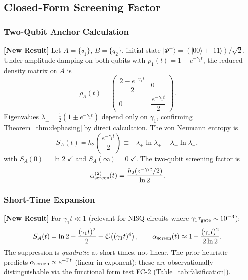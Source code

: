 \documentclass[12pt,letterpaper]{article}
\theoremstyle{definition}
\theoremstyle{remark}
\newcommand{\newresult}{\textbf{[New Result]}}
\newcommand{\ascreen}{\alpha_{\rm screen}}
\newcommand{\gammaone}{\gamma_{1}}
\newcommand{\half}{\tfrac{1}{2}}
\begin{document}
\subsection{Closed-Form Screening Factor}

\subsubsection{Two-Qubit Anchor Calculation}

\newresult{} Let $A = \{q_1\}$, $B = \{q_2\}$, initial state
$|\Phi^+\rangle = (|00\rangle + |11\rangle)/\sqrt{2}$.
Under amplitude damping on both qubits with $p_1(t) = 1-e^{-\gammaone t}$, the
reduced density matrix on $A$ is
\begin{equation}
\rho_A(t) = \begin{pmatrix}
  \dfrac{2 - e^{-\gammaone t}}{2} & 0 \\[6pt]
  0 & \dfrac{e^{-\gammaone t}}{2}
\end{pmatrix}.
\end{equation}
Eigenvalues $\lambda_\pm = \half(1\pm e^{-\gammaone t})$ depend only on $\gammaone$,
confirming Theorem~\ref{thm:dephasing} by direct calculation.  The von Neumann entropy is
\begin{equation}
S_A(t) = h_2\!\left(\frac{e^{-\gammaone t}}{2}\right)
         \equiv -\lambda_+\ln\lambda_+ - \lambda_-\ln\lambda_-,
\label{eq:SA2qubit}
\end{equation}
with $S_A(0) = \ln 2\;\checkmark$ and $S_A(\infty) = 0\;\checkmark$.
The two-qubit screening factor is
\begin{equation}
\alpha_{\rm screen}^{(2)}(t)
  = \frac{h_2\!\left(e^{-\gammaone t}/2\right)}{\ln 2}.
\label{eq:alpha2qubit}
\end{equation}

\subsubsection{Short-Time Expansion}

\newresult{} For $\gammaone t \ll 1$ (relevant for NISQ circuits where
$\gammaone\tau_{\rm gate}\sim 10^{-3}$):
\begin{equation}
S_A(t) = \ln 2 - \frac{(\gammaone t)^2}{2} + \mathcal{O}\!\left((\gammaone t)^4\right),
\qquad
\ascreen(t) \approx 1 - \frac{(\gammaone t)^2}{2\ln 2}.
\end{equation}
The suppression is \emph{quadratic} at short times, not linear.
The prior heuristic predicts $\ascreen\propto e^{-\Gamma t}$ (linear in exponent);
these are observationally distinguishable via the functional form test FC-2
(Table~\ref{tab:falsification}).
\end{document}
